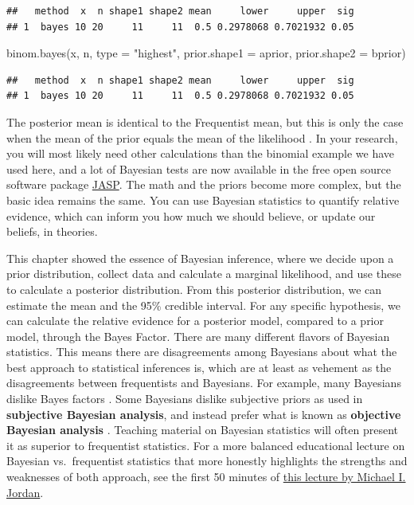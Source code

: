 \documentclass[
  oneside]{krantz}
\makeatletter
\newenvironment{Shaded}{\begin{snugshade}}{\end{snugshade}}
\newcommand{\AttributeTok}[1]{\textcolor[rgb]{0.61,0.61,0.61}{#1}}
\newcommand{\FunctionTok}[1]{\textcolor[rgb]{0,0,0}{#1}}
\newcommand{\NormalTok}[1]{#1}
\newcommand{\StringTok}[1]{\textcolor[rgb]{0.5,0.5,0.5}{#1}}
\newenvironment{kframe}{%
\medskip{}
\setlength{\fboxsep}{.8em}
 \def\at@end@of@kframe{}%
 \ifinner\ifhmode%
  \def\at@end@of@kframe{\end{minipage}}%
  \begin{minipage}{\columnwidth}%
 \fi\fi%
 \def\FrameCommand##1{\hskip\@totalleftmargin \hskip-\fboxsep
 \colorbox{shadecolor}{##1}\hskip-\fboxsep
     \hskip-\linewidth \hskip-\@totalleftmargin \hskip\columnwidth}%
 \MakeFramed {\advance\hsize-\width
   \@totalleftmargin\z@ \linewidth\hsize
   \@setminipage}}%
 {\par\unskip\endMakeFramed%
 \at@end@of@kframe}
\renewenvironment{Shaded}{\begin{kframe}}{\end{kframe}}
\makeatother
\begin{document}
\begin{verbatim}
##   method  x  n shape1 shape2 mean     lower     upper  sig
## 1  bayes 10 20     11     11  0.5 0.2978068 0.7021932 0.05
\end{verbatim}

\begin{Shaded}
\begin{Highlighting}[]
\FunctionTok{binom.bayes}\NormalTok{(x, n, }\AttributeTok{type =} \StringTok{"highest"}\NormalTok{, }\AttributeTok{prior.shape1 =}\NormalTok{ aprior, }\AttributeTok{prior.shape2 =}\NormalTok{ bprior)}
\end{Highlighting}
\end{Shaded}

\begin{verbatim}
##   method  x  n shape1 shape2 mean     lower     upper  sig
## 1  bayes 10 20     11     11  0.5 0.2978068 0.7021932 0.05
\end{verbatim}

The posterior mean is identical to the Frequentist mean, but this is only the case when the mean of the prior equals the mean of the likelihood \citep{albers_credible_2018}. In your research, you will most likely need other calculations than the binomial example we have used here, and a lot of Bayesian tests are now available in the free open source software package \href{https://jasp-stats.org/}{JASP}. The math and the priors become more complex, but the basic idea remains the same. You can use Bayesian statistics to quantify relative evidence, which can inform you how much we should believe, or update our beliefs, in theories.

This chapter showed the essence of Bayesian inference, where we decide upon a prior distribution, collect data and calculate a marginal likelihood, and use these to calculate a posterior distribution. From this posterior distribution, we can estimate the mean and the 95\% credible interval. For any specific hypothesis, we can calculate the relative evidence for a posterior model, compared to a prior model, through the Bayes Factor. There are many different flavors of Bayesian statistics. This means there are disagreements among Bayesians about what the best approach to statistical inferences is, which are at least as vehement as the disagreements between frequentists and Bayesians. For example, many Bayesians dislike Bayes factors \citep{mcelreath_statistical_2016}. Some Bayesians dislike subjective priors as used in \textbf{subjective Bayesian analysis}, and instead prefer what is known as \textbf{objective Bayesian analysis} \citep{berger_interplay_2004}. Teaching material on Bayesian statistics will often present it as superior to frequentist statistics. For a more balanced educational lecture on Bayesian vs.~frequentist statistics that more honestly highlights the strengths and weaknesses of both approach, see the first 50 minutes of \href{https://www.youtube.com/watch?v=HUAE26lNDuE}{this lecture by Michael I. Jordan}.
\end{document}

